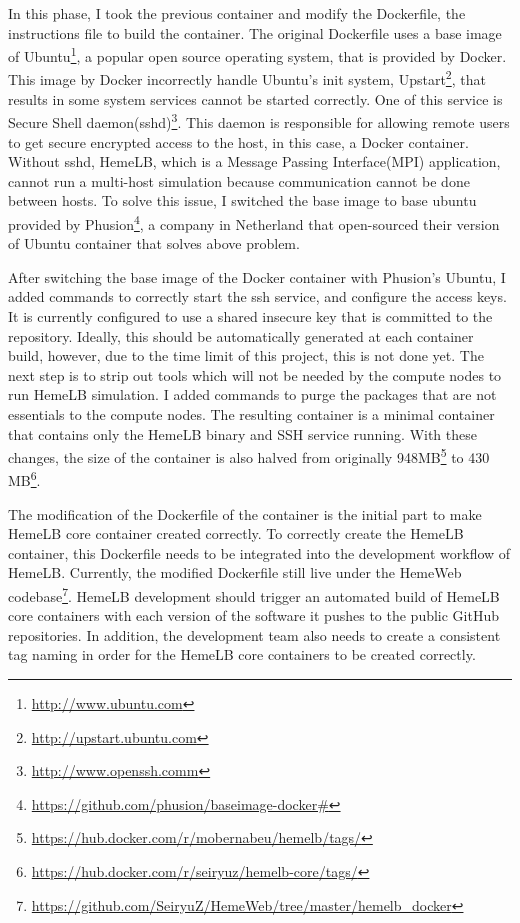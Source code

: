 In this phase, I took the previous container and modify the Dockerfile, the instructions file to build the container. The original Dockerfile uses a base image of Ubuntu\footnote{\url{http://www.ubuntu.com}}, a popular open source operating system, that is provided by Docker. This image by Docker incorrectly handle Ubuntu's init system, Upstart\footnote{\url{http://upstart.ubuntu.com}}, that results in some system services cannot be started correctly. One of this service is Secure Shell daemon(sshd)\footnote{\url{http://www.openssh.comm}}. This daemon is responsible for allowing remote users to get secure encrypted access to the host, in this case, a Docker container. Without sshd, HemeLB, which is a Message Passing Interface(MPI) application, cannot run a multi-host simulation because communication cannot be done between hosts.  To solve this issue, I switched the base image to base ubuntu provided by Phusion\footnote{\url{https://github.com/phusion/baseimage-docker#}}, a company in Netherland that open-sourced their version of Ubuntu container that solves above problem.

After switching the base image of the Docker container with Phusion's Ubuntu, I added commands to correctly start the ssh service, and configure the access keys. It is currently configured to use a shared insecure key that is committed to the repository. Ideally, this should be automatically generated at each container build, however, due to the  time limit of this project, this is not done yet. The next step is to strip out tools which will not be needed by the compute nodes to run HemeLB simulation. I added commands to purge the packages that are not essentials to the compute nodes. The resulting container is a minimal container that contains only the HemeLB binary and SSH service running. With these changes, the size of the container is also halved from originally 948MB\footnote{\url{https://hub.docker.com/r/mobernabeu/hemelb/tags/}} to 430 MB\footnote{\url{https://hub.docker.com/r/seiryuz/hemelb-core/tags/}}.


The modification of the Dockerfile of the container is the initial part to make HemeLB core container created correctly. To correctly create the HemeLB container, this Dockerfile needs to be integrated into the development workflow of HemeLB. Currently, the modified Dockerfile still live under the HemeWeb codebase\footnote{\url{https://github.com/SeiryuZ/HemeWeb/tree/master/hemelb_docker}}. HemeLB development should trigger an automated build of HemeLB core containers with each version of the software it pushes to the public GitHub repositories. In addition, the development team also needs to create a consistent tag naming in order for the HemeLB core containers to be created correctly.


